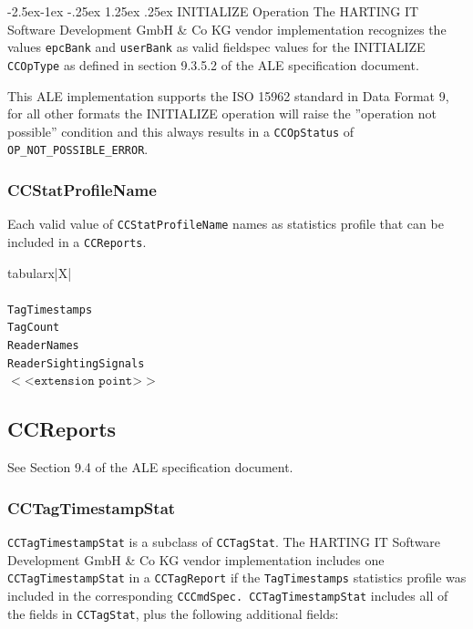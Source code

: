 \documentclass[11pt,a4paper,oneside]{article}
\makeatletter
\renewcommand\paragraph{\@startsection{paragraph}{4}{\z@}%
            {-2.5ex\@plus -1ex \@minus -.25ex}%
            {1.25ex \@plus .25ex}%
            {\normalfont\normalsize\bfseries}}
\newenvironment{bbox}%
{\begin{table}[h!]\begin{threeparttable}}%
{\end{threeparttable}\end{table}\FloatBarrier}
\newenvironment{bbox}
{\ifvmode\IgnorePar\fi \EndP\Tg<div class='bbox'>}{\Tg</div>\IgnoreIndent}
\makeatother
\begin{document}
\paragraph{INITIALIZE Operation}
The HARTING IT Software Development GmbH \& Co KG vendor implementation recognizes the values \texttt{epcBank} and \texttt{userBank} as valid fieldspec values for the INITIALIZE \texttt{CCOpType} as defined in section 9.3.5.2 of the ALE specification document. 

This ALE implementation supports the ISO 15962 standard in Data Format 9, for all other formats the INITIALIZE operation will raise the ''operation not possible'' condition and this always results in a \texttt{CCOpStatus} of \texttt{OP\_NOT\_POSSIBLE\_ERROR}.


\subsubsection{CCStatProfileName}
Each valid value of \texttt{CCStatProfileName} names as statistics profile that can be included in a \texttt{CCReports}.

\begin{bbox}
\begin{edtable}{tabularx}{\linewidth}{|X|}
\hline 
{}
\\
\\
\texttt{TagTimestamps}\\
\texttt{TagCount}\\
\texttt{ReaderNames}\\
\texttt{ReaderSightingSignals}\\
$<$<$\texttt{extension point}$>$>$\\
\hline
\end{edtable}
\end{bbox}

\subsection{CCReports}
See Section 9.4 of the ALE specification document.
\subsubsection{CCTagTimestampStat}
\texttt{CCTagTimestampStat} is a subclass of \texttt{CCTagStat}. The HARTING IT Software Development GmbH \& Co KG vendor implementation includes one \texttt{CCTagTimestampStat} in a \texttt{CCTagReport} if the \texttt{TagTimestamps} statistics profile was included in the corresponding \texttt{CCCmdSpec. CCTagTimestampStat} includes all of the fields in \texttt{CCTagStat}, plus the following additional fields:
\end{document}
